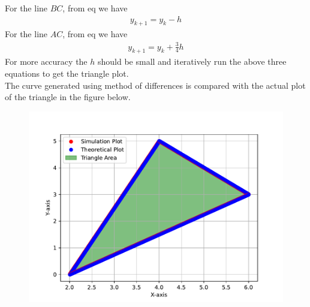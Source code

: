 \documentclass[journal]{IEEEtran}
\begin{document}
For the line $BC$, from eq we have
\begin{align}
    y_{k+1}=y_k-h
\end{align}
For the line $AC$, from eq we have
\begin{align}
    y_{k+1}=y_k+\frac{3}{4}h
\end{align}
For more accuracy the $h$ should be small and iteratively run the above three equations to get the triangle plot.\\The curve generated using method of differences is compared with the actual plot of the triangle in the figure below.
\begin{figure}[h!]
   \centering
   \includegraphics[width=\columnwidth]{figs/fig.png}
\end{figure}
\end{document}
